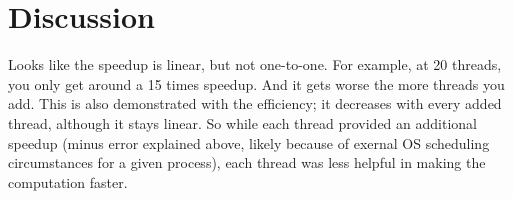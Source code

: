 \documentclass{article}
\begin{document}
\section{Discussion}


Looks like the speedup is linear, but not one-to-one. For example, at 20 threads, you only
get around a 15 times speedup. And it gets worse the more threads you add. This is also
demonstrated with the efficiency; it decreases with every added thread, although it stays
linear. So while each thread provided an additional speedup (minus error explained above,
likely because of exernal OS scheduling circumstances for a given process), each thread
was less helpful in making the computation faster.
\end{document}
